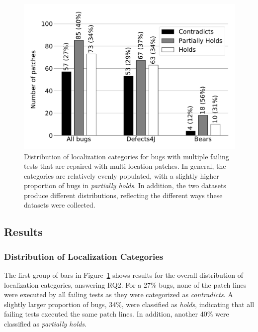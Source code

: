 \documentclass[10pt, conference]{IEEEtran}
\begin{document}
\begin{figure}
	\includegraphics[width=\linewidth]{img/coverage_hist_all.pdf}
	\caption{Distribution of localization categories for bugs with multiple failing
      tests that are repaired with multi-location patches. In general, the categories are relatively 
      evenly populated, with a slightly higher proportion of bugs in \emph{partially holds}. In 
      addition, the two datasets produce different distributions, reflecting the different 
      ways these datasets were collected.}
	\label{fig:coverage-all}
\end{figure}

\subsection{Results}

\subsubsection{Distribution of Localization Categories} \label{sec:cov_patterns}

The first group of bars in Figure~\ref{fig:coverage-all} shows results for the overall distribution 
of localization categories, 
answering RQ2. 
For a 27\% bugs, none of the patch lines were executed by all failing tests as they were 
categorized as \emph{contradicts}.  A slightly larger proportion of bugs, 34\%, were classified 
as 
\emph{holds}, indicating that all failing tests executed the same patch lines.
In addition, another 40\% were classified as \emph{partially holds}.
\end{document}
